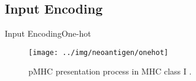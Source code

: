 \documentclass[10pt]{beamer}
\newcommand{\1}{
	\setbeamertemplate{background}{
		\texttt{[image: ../img/1]}
		\tikz[overlay] \fill[fill opacity=0.75,fill=white] (0,0) rectangle (-\paperwidth,\paperheight);
	}
}
\begin{document}
	
	\subsection{Input Encoding}
	
	
	\begin{frame}{Input Encoding}{One-hot}	
		
		\begin{figure}[H]
			\centering
			\texttt{[image: ../img/neoantigen/onehot]}
			\caption{pMHC presentation process in MHC class I \cite{zhang2019application}.}		
		\end{figure}
	\end{frame}
	
\end{document}
